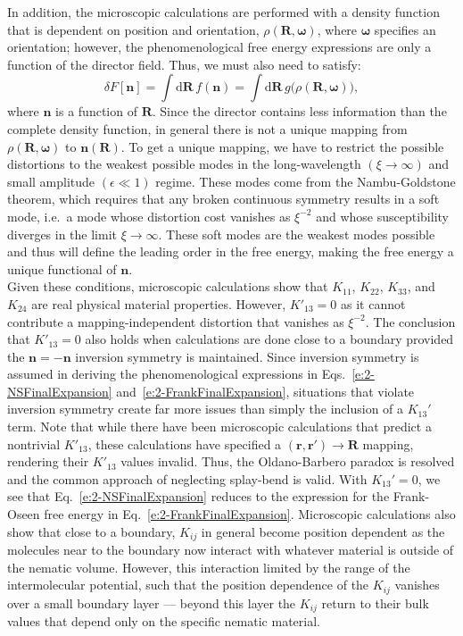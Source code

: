 In addition, the microscopic calculations are performed with a density function that is dependent on position and orientation, $\rho(\mathbf{R},\mathbf{\omega})$, where $\mathbf{\omega}$ specifies an orientation; however, the phenomenological free energy expressions are only a function of the director field.
Thus, we must also need to satisfy:
\begin{equation}
  \delta F[\mathbf{n}] = \int \textrm{d} \mathbf{R} \, f(\mathbf{n}) = \int \textrm{d} \mathbf{R} \, g \big ( \rho(\mathbf{R},\mathbf{\omega}) \big),\label{e:2-LessInfo}
\end{equation}
where $\mathbf{n}$ is a function of $\mathbf{R}$.
Since the director contains less information than the complete density function, in general there is not a unique mapping from  $\rho(\mathbf{R},\mathbf{\omega})$ to $\mathbf{n}(\mathbf{R})$.
To get a unique mapping, we have to restrict the possible distortions to the weakest possible modes in the long-wavelength $(\xi \rightarrow \infty)$ and small amplitude $(\epsilon \ll 1)$ regime.
These modes come from the Nambu-Goldstone theorem, which requires that any broken continuous symmetry results in a soft mode, i.e.\ a mode whose distortion cost vanishes as $\xi^{-2}$ and whose susceptibility diverges in the limit $\xi \rightarrow \infty$.
These soft modes are the weakest modes possible and thus will define the leading order in the free energy, making the free energy a unique functional of $\mathbf{n}$. \\

Given these conditions, microscopic calculations show that $K_{11}$, $K_{22}$, $K_{33}$, and $K_{24}$ are real physical material properties.
However, $K'_{13} = 0$ as it cannot contribute a mapping-independent distortion that vanishes as $\xi^{-2}$.
The conclusion that $K'_{13} = 0$ also holds when calculations are done close to a boundary provided the $\mathbf{n} = -\mathbf{n}$ inversion symmetry is maintained.
Since inversion symmetry is assumed in deriving the phenomenological expressions in Eqs.~\ref{e:2-NSFinalExpansion} and~\ref{e:2-FrankFinalExpansion}, situations that violate inversion symmetry create far more issues than simply the inclusion of a $K_{13}'$ term.
Note that while there have been microscopic calculations that predict a nontrivial $K'_{13}$, these calculations have specified a $(\mathbf{r},\mathbf{r}') \rightarrow \mathbf{R}$ mapping, rendering their $K'_{13}$ values invalid.
Thus, the Oldano-Barbero paradox is resolved and the common approach of neglecting splay-bend is valid.
With $K_{13}'=0$, we see that Eq.~\ref{e:2-NSFinalExpansion} reduces to the expression for the Frank-Oseen free energy in Eq.~\ref{e:2-FrankFinalExpansion}.
Microscopic calculations also show that close to a boundary, $K_{ij}$ in general become position dependent as the molecules near to the boundary now interact with whatever material is outside of the nematic volume.
However, this interaction limited by the range of the intermolecular potential, such that the position dependence of the $K_{ij}$ vanishes over a small boundary layer --- beyond this layer the $K_{ij}$ return to their bulk values that depend only on the specific nematic material.\\


